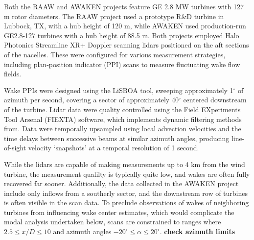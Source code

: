 \documentclass[%
 aip,
 amsmath,
 amssymb,
]{revtex4-2}
\newcommand{\comment}[1]{\textbf{\textcolor{red!50!black}{#1}}}
\begin{document}
Both the RAAW and AWAKEN projects feature GE 2.8 MW turbines with 127 m rotor diameters. 
The RAAW project used a prototype R\&D turbine in Lubbock, TX, with a hub height of 120 m, while AWAKEN used production-run GE2.8-127 turbines with a hub height of 88.5 m. 
Both projects employed Halo Photonics Streamline XR+ Doppler scanning lidars positioned on the aft sections of the nacelles. 
These were configured for various measurement strategies, including plan-position indicator (PPI) scans to measure fluctuating wake flow fields.

Wake PPIs were designed using the LiSBOA tool,\cite{letizia2021lisboa} sweeping approximately 1$^\circ$ of azimuth per second, covering a sector of approximately 40$^\circ$ centered downstream of the turbine. 
Lidar data were quality controlled using the Field EXperiments Tool Arsenal (FIEXTA) software,\cite{nrelfiexta2024} which implements dynamic filtering methods from.\citet{beckDynamicDataFiltering2017}
Data were temporally upsampled using local advection velocities and the time delays between successive beams at similar azimuth angles,\cite{beckTemporalUpSamplingPlanar2019} producing line-of-sight velocity `snapshots' at a temporal resolution of 1 second.

While the lidars are capable of making measurements up to 4 km from the wind turbine, the measurement qualilty is typically quite low, and wakes are often fully recovered far sooner.
Additionally, the data collected in the AWAKEN project include only inflows from a southerly sector, and the downstream row of turbines is often visible in the scan data. 
To preclude observations of wakes of neighboring turbines from influencing wake center estimates, which would complicate the modal analysis undertaken below, scans are constrained to ranges where $2.5 \le x/D \le 10$ and azimuth angles $-20^\circ \le \alpha \le 20^\circ$. 
\comment{check azimuth limits}

\end{document}

